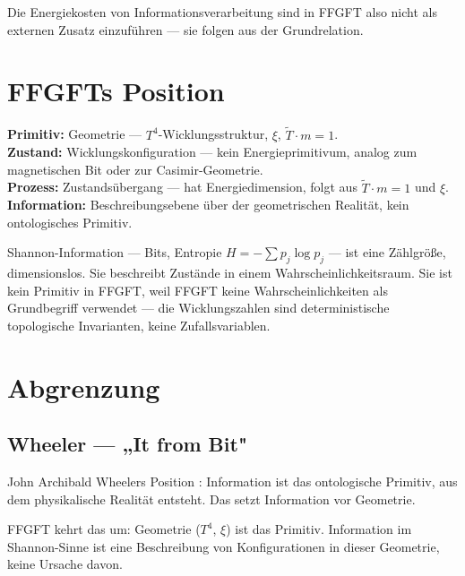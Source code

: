 Die Energiekosten von Informationsverarbeitung sind in FFGFT also nicht
als externen Zusatz einzuführen — sie folgen aus der Grundrelation.

\section{FFGFTs Position}

\begin{keyresult}
\textbf{Primitiv:} Geometrie — $T^4$-Wicklungsstruktur, $\xi$, $\tilde{T}\cdot m=1$.\\
\textbf{Zustand:} Wicklungskonfiguration — kein Energieprimitivum, analog
zum magnetischen Bit oder zur Casimir-Geometrie.\\
\textbf{Prozess:} Zustandsübergang — hat Energiedimension, folgt aus
$\tilde{T}\cdot m=1$ und $\xi$.\\
\textbf{Information:} Beschreibungsebene über der geometrischen Realität,
kein ontologisches Primitiv.
\end{keyresult}

Shannon-Information \cite{Shannon1948} — Bits, Entropie $H = -\sum p_j \log p_j$
— ist eine Zählgröße, dimensionslos. Sie beschreibt Zustände in einem
Wahrscheinlichkeitsraum. Sie ist kein Primitiv in FFGFT, weil FFGFT
keine Wahrscheinlichkeiten als Grundbegriff verwendet — die Wicklungszahlen
sind deterministische topologische Invarianten, keine Zufallsvariablen.

\section{Abgrenzung}

\subsection{Wheeler — „It from Bit"}

John Archibald Wheelers Position \cite{Wheeler1990}: Information ist das
ontologische Primitiv, aus dem physikalische Realität entsteht. Das setzt
Information vor Geometrie.

FFGFT kehrt das um: Geometrie ($T^4$, $\xi$) ist das Primitiv. Information
im Shannon-Sinne ist eine Beschreibung von Konfigurationen in dieser Geometrie,
keine Ursache davon.

